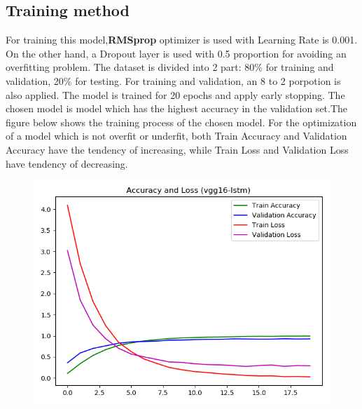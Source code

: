 \subsection{Training method}
For training this model,\textbf{RMSprop} optimizer is used with Learning Rate is 0.001. On the other hand, a Dropout layer is used with 0.5 proportion for avoiding an overfitting problem. The dataset is divided into 2 part: 80\% for training and validation, 20\% for testing. For training and validation, an 8 to 2 porpotion is also applied. The model is trained for 20 epochs and apply early stopping. The chosen model is model which has the highest accuracy in the validation set.The figure below shows the training process of the chosen model. For the optimization of a model which is not overfit or underfit, both Train Accuracy and Validation Accuracy have the tendency of increasing, while Train Loss and Validation Loss have tendency of decreasing.
 
\begin{center}
	\begin{figure}[H]
		\centering
		\includegraphics[width=0.8\columnwidth]{images/chap3/acc-and-loss.png}
		\label{chap3:acc-and-loss}
	\end{figure}
\end{center}
